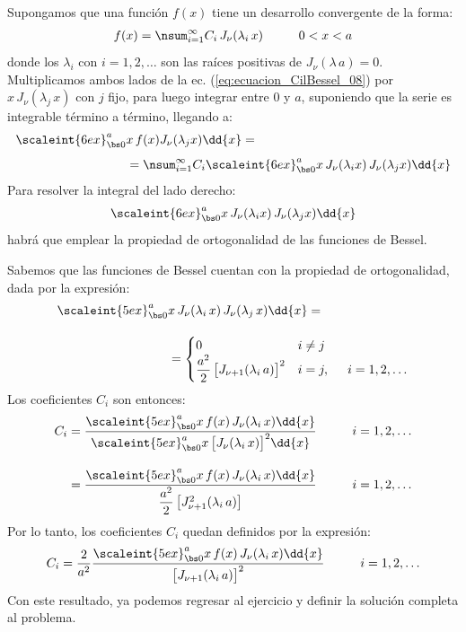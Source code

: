 Supongamos que una función $f(x)$ tiene un desarrollo convergente de la forma:
\begin{align}
f(x) = \nsum_{i=1}^{\infty} C_{i} \, J_{\nu} (\lambda_{i} \, x) \hspace{1cm} 0 < x < a
\label{eq:ecuacion_CilBessel_08}
\end{align}
donde los $\lambda_{i}$ con $i = 1, 2, \ldots$ son las raíces positivas de $J_{\nu} (\lambda \, a) = 0$. Multiplicamos ambos lados de la ec. (\ref{eq:ecuacion_CilBessel_08}) por $x \, J_{\nu}(\lambda_{j} \, x)$ con $j$ fijo, para luego integrar entre $0$ y $a$, suponiendo que la serie es integrable término a término, llegando a:
\begin{align*}
\scaleint{6ex}_{\bs 0}^{a} &x \, f(x) J_{\nu}(\lambda_{j} x) \dd{x} = \\[0.5em]
&= \nsum_{i=1}^{\infty} C_{i} \scaleint{6ex}_{\bs 0}^{a} x \, J_{\nu} (\lambda_{i} x) \, J_{\nu} (\lambda_{j} x) \dd{x}
\end{align*}
Para resolver la integral del lado derecho:
\begin{align*}
\scaleint{6ex}_{\bs 0}^{a} x \, J_{\nu} (\lambda_{i} x) \, J_{\nu} (\lambda_{j} x) \dd{x}
\end{align*}
habrá que emplear la propiedad de ortogonalidad de las funciones de Bessel.
\par
Sabemos que las funciones de Bessel cuentan con la propiedad de ortogonalidad, dada por la expresión:
\begin{align*}
\scaleint{5ex}_{\bs 0}^{a} &x \, J_{\nu} (\lambda_{i} \, x) \, J_{\nu} (\lambda_{j} \, x) \dd{x} = \\[1em]
&= \begin{cases}
0 & i \neq j \\
\dfrac{a^{2}}{2} \, \big[ J_{\nu+1} (\lambda_{i} \, a)\big]^{2} & i = j, \hspace{0.5cm} i = 1, 2, \ldots
\end{cases}
\end{align*}
Los coeficientes $C_{i}$ son entonces:
\begin{eqnarray*}
\begin{aligned}
C_{i} &= \dfrac{\scaleint{5ex}_{\bs 0}^{a} x \, f(x) \, J_{\nu}(\lambda_{i} \, x) \dd{x}}{\scaleint{5ex}_{\bs 0}^{a} x \, \big[ J_{\nu} (\lambda_{i} \, x) \big]^{2} \dd{x}} \hspace{1cm} i = 1, 2, \ldots \\[1em] 
&= \dfrac{\scaleint{5ex}_{\bs 0}^{a} x \, f(x) \, J_{\nu}(\lambda_{i} \, x) \dd{x}}{\dfrac{a^{2}}{2} \, \big[ J_{\nu+1}^{2} (\lambda_{i} \, a) \big]} \hspace{1cm} i = 1, 2, \ldots
\end{aligned}
\end{eqnarray*}
Por lo tanto, los coeficientes $C_{i}$ quedan definidos por la expresión:
\begin{align*}
C_{i} = \dfrac{2}{a^{2}} \dfrac{\scaleint{5ex}_{\bs 0}^{a} x \, f(x) \, J_{\nu}(\lambda_{i} \, x) \dd{x}}{ \big[ J_{\nu+1} (\lambda_{i} \, a) \big]^{2}} \hspace{1cm} i = 1, 2, \ldots
\end{align*}
Con este resultado, ya podemos regresar al ejercicio y definir la solución completa al problema.

